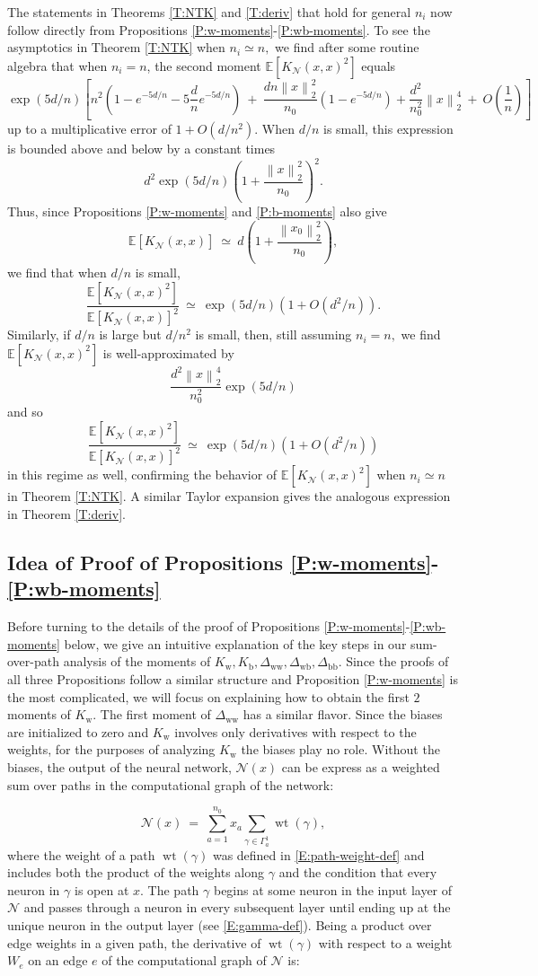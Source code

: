 \documentclass[11pt, reqno]{amsart}
\newcommand{\E}[1]{{\mathbb E}\left [#1\right]}
\newcommand{\lr}[1]{\ensuremath{\left(#1 \right)}}
\newcommand{\norm}[1]{\left\lVert#1\right\rVert}
\newcommand{\mN}{\mathcal N}
\newcommand{\Kw}{K_{\mathrm{w}}}
\newcommand{\Kb}{K_{\mathrm{b}}}
\newcommand{\Dww}{\Delta_{\mathrm{ww}}}
\newcommand{\Dwb}{\Delta_{\mathrm{wb}}}
\newcommand{\Dbb}{\Delta_{\mathrm{bb}}}
\DeclareMathOperator{\wt}{wt}
\begin{document}
\noindent The statements in Theorems \ref{T:NTK} and \ref{T:deriv} that hold for general $n_i$ now follow directly from Propositions \ref{P:w-moments}-\ref{P:wb-moments}. To see the asymptotics in Theorem \ref{T:NTK} when $n_i\simeq n,$ we find after some routine algebra that when $n_i=n$, the second moment $\E{K_{\mN}(x,x)^2}$ equals
\[\exp(5d/n)\left[n^2\lr{1-e^{-5d/n}-5\frac{d}{n}e^{-5d/n}}~+~\frac{d n\norm{x}_2^2}{n_0}\lr{1-e^{-5d/n}}+\frac{d^2}{n_0^2}\norm{x}_2^4~+~O\lr{\frac{1}{n}}\right]\]
up to a multiplicative error of $1+O(d/n^2).$ When $d/n$ is small, this expression is bounded above and below by a constant times
\[d^2\exp(5d/n)\lr{1+\frac{\norm{x}_2^2}{n_0}}^2.\]
Thus, since Propositions \ref{P:w-moments} and \ref{P:b-moments} also give
\[\E{K_{\mN}(x,x)}~\simeq~d\lr{1 + \frac{\norm{x_0}_2^2}{n_0}},\]
we find that when $d/n$ is small, 
\[\frac{\E{K_{\mN}(x,x)^2}}{\E{K_{\mN}(x,x)}^2}~\simeq~ \exp(5d/n)\lr{1+O(d^2/n)}.\]
Similarly, if $d/n$ is large but $d/n^2$ is small, then, still assuming $n_i=n,$ we find $\E{K_{\mN}(x,x)^2}$ is well-approximated by
\[\frac{d^2\norm{x}_2^4}{n_0^2}\exp(5d/n)\]
and so 
\[\frac{\E{K_{\mN}(x,x)^2}}{\E{K_{\mN}(x,x)}^2}~\simeq~ \exp(5d/n)\lr{1+O(d^2/n)}\]
in this regime as well, confirming the behavior of $\E{K_{\mN}(x,x)^2}$ when $n_i\simeq n$ in Theorem \ref{T:NTK}. A similar Taylor expansion gives the analogous expression in Theorem \ref{T:deriv}.

\subsection{Idea of Proof of Propositions \ref{P:w-moments}-\ref{P:wb-moments}}\label{S:idea} Before turning to the details of the proof of Propositions \ref{P:w-moments}-\ref{P:wb-moments} below, we give an intuitive explanation of the key steps in our sum-over-path analysis of the moments of $\Kw,\Kb,\Dww,\Dwb,\Dbb.$ Since the proofs of all three Propositions follow a similar structure and Proposition \ref{P:w-moments} is the most complicated, we will focus on explaining how to obtain the first $2$ moments of  $\Kw$. The first moment of $\Dww$ has a similar flavor. Since the biases are initialized to zero and $\Kw$ involves only derivatives with respect to the weights, for the purposes of analyzing $\Kw$ the biases play no role. Without the biases, the output of the neural network, $\mN(x)$ can be express as a weighted sum over paths in the computational graph of the network:

\begin{equation*}
\mN(x)~=~\sum_{a=1}^{n_0}x_a \sum_{\gamma\in \Gamma_{a}^1}\wt(\gamma),
\end{equation*}
where the weight of a path $\wt(\gamma)$ was defined in \eqref{E:path-weight-def} and includes both the product of the weights along $\gamma$ and the condition that every neuron in $\gamma$ is open at $x$. The path $\gamma$ begins at some neuron in the input layer of $\mN$ and passes through a neuron in every subsequent layer until ending up at the unique neuron in the output layer (see \eqref{E:gamma-def}). Being a product over edge weights in a given path, the derivative of $\wt(\gamma)$ with respect to a weight $W_e$ on an edge $e$ of the computational graph of $\mN$ is:
\end{document}

